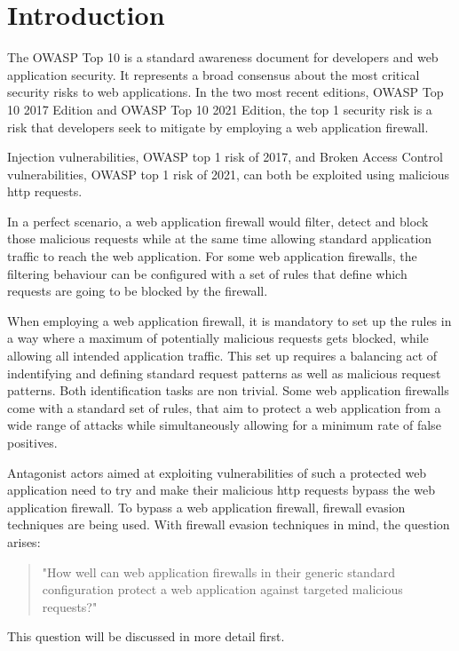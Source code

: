 \section{Introduction}
The OWASP Top 10 is a standard awareness document for developers and web application security. It represents a broad consensus about the most critical security risks to web applications.
In the two most recent editions, OWASP Top 10 2017 Edition and OWASP Top 10 2021 Edition, the top 1 security risk is a risk that developers seek to mitigate by employing a web application firewall. \cite{OWASP/Top10,OWASP/Risks2017,OWASP/Risks2021}

Injection vulnerabilities, OWASP top 1 risk of 2017, and Broken Access Control vulnerabilities, OWASP top 1 risk of 2021, can both be exploited using malicious \acrfull{http} requests. \cite{OWASP/Injection,OWASP/BrokenAccessControl}

In a perfect scenario, a web application firewall would filter, detect and block those malicious requests while at the same time allowing standard application traffic to reach the web application. 
For some web application firewalls, the filtering behaviour can be configured with a set of rules that define which requests are going to be blocked by the firewall. \cite{OWASP/CRS,wargio/naxsiRules,Cisco/SnortRulesDocs}


When employing a web application firewall, it is mandatory to set up the rules in a way where a maximum of potentially malicious requests gets blocked, while allowing all intended application traffic. This set up requires a balancing act of indentifying and defining standard request patterns as well as malicious request patterns. Both identification tasks are non trivial. Some web application firewalls come with a standard set of rules, that aim to protect a web application from a wide range of attacks while simultaneously allowing for a minimum rate of false positives. \cite{OWASP/CRS,wargio/naxsiRules,Cisco/SnortRulesDownload}

Antagonist actors aimed at exploiting vulnerabilities of such a protected web application need to try and make their malicious \acrshort{http} requests bypass the web application firewall. To bypass a web application firewall, firewall evasion techniques are being used. \cite{HackTricks/WAFBypass} With firewall evasion techniques in mind, the question arises: 
\begin{quote} "How well can web application firewalls in their generic standard configuration protect a web application against targeted malicious requests?" 
\end{quote}
This question will be discussed in more detail first.
